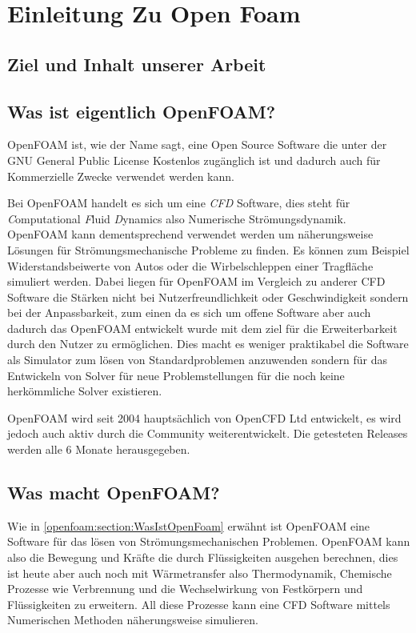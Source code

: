 %
%
%
%
\section{Einleitung Zu Open Foam\label{openfoam:section:Einleitung}}
\subsection{Ziel und Inhalt unserer Arbeit}

\subsection{Was ist eigentlich OpenFOAM?\label{openfoam:section:WasIstOpenFoam}}
OpenFOAM ist, wie der Name sagt, eine Open Source Software die unter der GNU
General Public License Kostenlos zugänglich ist und dadurch auch für Kommerzielle Zwecke 
verwendet werden kann. 

Bei OpenFOAM handelt es sich um eine \emph{CFD} Software, 
dies steht für \emph{C}omputational \emph{F}luid \emph{D}ynamics also Numerische Strömungsdynamik.
OpenFOAM kann dementsprechend verwendet werden um näherungsweise Lösungen für 
Strömungsmechanische Probleme zu finden.
Es können zum Beispiel Widerstandsbeiwerte von Autos oder die Wirbelschleppen einer Tragfläche simuliert werden.
Dabei liegen für OpenFOAM im Vergleich zu anderer CFD Software die Stärken nicht bei Nutzerfreundlichkeit oder Geschwindigkeit sondern bei der Anpassbarkeit, zum einen da es sich um offene Software aber auch dadurch das OpenFOAM entwickelt wurde mit dem ziel für die Erweiterbarkeit durch den Nutzer zu ermöglichen. Dies macht es weniger praktikabel die Software als Simulator zum lösen von Standardproblemen anzuwenden sondern für das Entwickeln von Solver für neue Problemstellungen für die noch keine herkömmliche Solver existieren.

OpenFOAM wird seit 2004 hauptsächlich von OpenCFD Ltd entwickelt, es wird jedoch auch aktiv durch die Community weiterentwickelt.
Die getesteten Releases werden alle 6 Monate herausgegeben. \cite{openfoam:greenshieldsweller2022}

\subsection{Was macht OpenFOAM?}
Wie in \ref{openfoam:section:WasIstOpenFoam} erwähnt ist OpenFOAM eine Software für das lösen von Strömungsmechanischen Problemen.
OpenFOAM kann also die Bewegung und Kräfte die durch Flüssigkeiten ausgehen berechnen, 
dies ist heute aber auch noch mit Wärmetransfer also Thermodynamik, Chemische Prozesse wie Verbrennung
und die Wechselwirkung von Festkörpern und Flüssigkeiten zu erweitern. 
All diese Prozesse kann eine CFD Software mittels Numerischen Methoden näherungsweise simulieren. 
 \cite{openfoam:greenshieldsweller2022} 